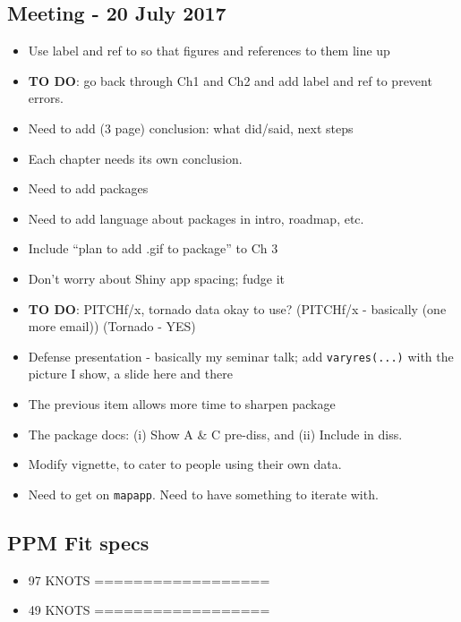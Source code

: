 \documentclass{article}
\begin{document}
\subsection*{Meeting - 20 July 2017}
\begin{itemize}
\item Use label and ref to so that figures and references to them line up \checkmark
\item {\bf TO DO}: go back through Ch1 and Ch2 and add label and ref to prevent errors. \checkmark
\item Need to add (3 page) conclusion: what did/said, next steps \checkmark
\item Each chapter needs its own conclusion.
\item Need to add packages \checkmark
\item Need to add language about packages in intro, roadmap, etc. \checkmark
\item Include ``plan to add .gif to package'' to Ch 3
\item Don't worry about Shiny app spacing; fudge it
\item {\bf TO DO}: PITCHf/x, tornado data okay to use? (PITCHf/x - basically (one more email)) (Tornado - YES) \checkmark
\item Defense presentation - basically my seminar talk; add \verb|varyres(...)| with the picture I show, a slide here and there
\item The previous item allows more time to sharpen package
\item The package docs: (i) Show A \& C pre-diss, and (ii) Include in diss.
\item Modify vignette, to cater to people using their own data.
\item Need to get on \verb|mapapp|. Need to have something to iterate with.
\end{itemize}

\subsection*{PPM Fit specs}
\begin{itemize}
\item 97 KNOTS ==================
\item 49 KNOTS ==================
\end{itemize}
\end{document}
